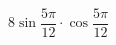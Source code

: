 \begin{ex}[type=type=expression]
	\begin{condition}
		\( 8\sin\dfrac{5\pi}{12}\cdot\cos\dfrac{5\pi}{12} \)
	\end{condition}
\end{ex}